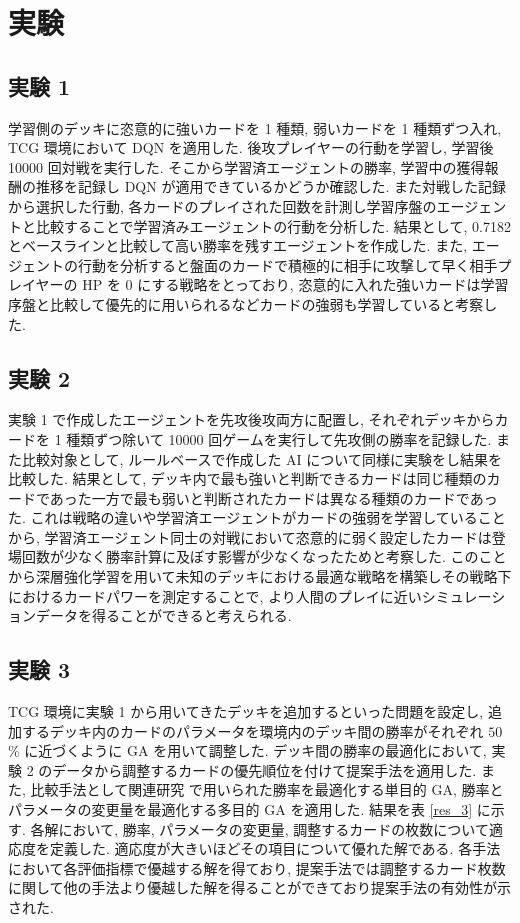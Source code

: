 \documentclass[a4paper,twoside,twocolumn,10pt]{article}
\begin{document}
 

\section{実験}
\subsection{実験 1}
 学習側のデッキに恣意的に強いカードを 1 種類, 弱いカードを 1 種類ずつ入れ, TCG 環境において DQN を適用した. 後攻プレイヤーの行動を学習し, 学習後 10000 回対戦を実行した. そこから学習済エージェントの勝率, 学習中の獲得報酬の推移を記録し DQN が適用できているかどうか確認した. また対戦した記録から選択した行動, 各カードのプレイされた回数を計測し学習序盤のエージェントと比較することで学習済みエージェントの行動を分析した.
結果として, 0.7182 とベースラインと比較して高い勝率を残すエージェントを作成した. また, エージェントの行動を分析すると盤面のカードで積極的に相手に攻撃して早く相手プレイヤーの HP を 0 にする戦略をとっており, 恣意的に入れた強いカードは学習序盤と比較して優先的に用いられるなどカードの強弱も学習していると考察した.
\subsection{実験 2}
実験 1 で作成したエージェントを先攻後攻両方に配置し, それぞれデッキからカードを 1 種類ずつ除いて 10000 回ゲームを実行して先攻側の勝率を記録した. また比較対象として, ルールベースで作成した AI について同様に実験をし結果を比較した. 結果として, デッキ内で最も強いと判断できるカードは同じ種類のカードであった一方で最も弱いと判断されたカードは異なる種類のカードであった. これは戦略の違いや学習済エージェントがカードの強弱を学習していることから, 学習済エージェント同士の対戦において恣意的に弱く設定したカードは登場回数が少なく勝率計算に及ぼす影響が少なくなったためと考察した. このことから深層強化学習を用いて未知のデッキにおける最適な戦略を構築しその戦略下におけるカードパワーを測定することで, より人間のプレイに近いシミュレーションデータを得ることができると考えられる.
\subsection{実験 3}
TCG 環境に実験 1 から用いてきたデッキを追加するといった問題を設定し, 追加するデッキ内のカードのパラメータを環境内のデッキ間の勝率がそれぞれ $50$\% に近づくように GA を用いて調整した. デッキ間の勝率の最適化において, 実験 2 のデータから調整するカードの優先順位を付けて提案手法を適用した. また, 比較手法として関連研究 \cite{EvolvingHearthStone} で用いられた勝率を最適化する単目的 GA, 勝率とパラメータの変更量を最適化する多目的 GA を適用した. 結果を表 \ref{res_3} に示す. 各解において, 勝率, パラメータの変更量, 調整するカードの枚数について適応度を定義した. 適応度が大きいほどその項目について優れた解である. 各手法において各評価指標で優越する解を得ており, 提案手法では調整するカード枚数に関して他の手法より優越した解を得ることができており提案手法の有効性が示された. 
\end{document}
